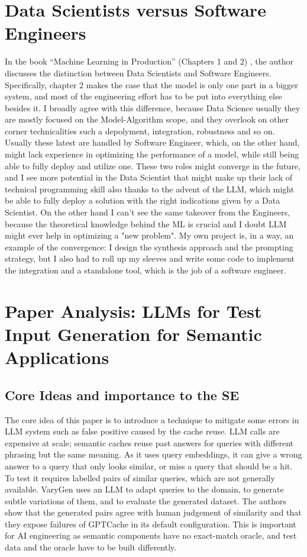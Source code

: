 \documentclass[11pt]{article}
\begin{document}
\section{Data Scientists versus Software Engineers}
In the book “Machine Learning in Production” (Chapters 1 and 2) \cite{kastner}, the author discusses the distinction between Data Scientists and Software Engineers. Specifically, chapter 2 makes the case that the model is only one part in a bigger system, and most of the engineering effort has to be put into everything else besides it.
I broadly agree with this difference, because Data Science usually they are mostly focused on the Model-Algorithm scope, and they overlook on other corner technicalities such a depolyment, integration, robustness and so on.
Usually these latest are handled by Software Engineer, which, on the other hand, might lack experience in optimizing the performance of a model, while still being able to fully deploy and utilize one.
These two roles might converge in the future, and I see more potential in the Data Scientist that might make up their lack of technical programming skill also thanks to the advent of the LLM, which might be able to fully deploy a solution with the right indications given by a Data Scientist. 
On the other hand I can't see the same takeover from the Engineers, because the theoretical knowledge behind the ML is crucial and I doubt LLM might ever help in optimizing a "new problem". 
My own project is, in a way, an example of the convergence: I design the synthesis approach and the prompting strategy, but I also had to roll up my sleeves and write some code to implement the integration and a standalone tool, which is the job of a software engineer.

\section{Paper Analysis: LLMs for Test Input Generation for Semantic Applications \cite{rasool2024}}

\subsection{Core Ideas and importance to the SE}
The core idea of this paper is to introduce a technique to mitigate some errors in LLM system such as false positive caused by the cache reuse.
LLM calls are expensive at scale; semantic caches reuse past answers for queries with different phrasing but the same meaning. As it uses query embeddings, it can give a wrong answer to a query that only looks similar, or miss a query that should be a hit. To test it requires labelled pairs of similar queries, which are not generally available. VaryGen uses an LLM to adapt queries to the domain, to generate subtle variations of them, and to evaluate the generated dataset. The authors show that the generated pairs agree with human judgement of similarity and that they expose failures of GPTCache in its default configuration. This is important for AI engineering as semantic components have no exact-match oracle, and test data and the oracle have to be built differently.
\end{document}
